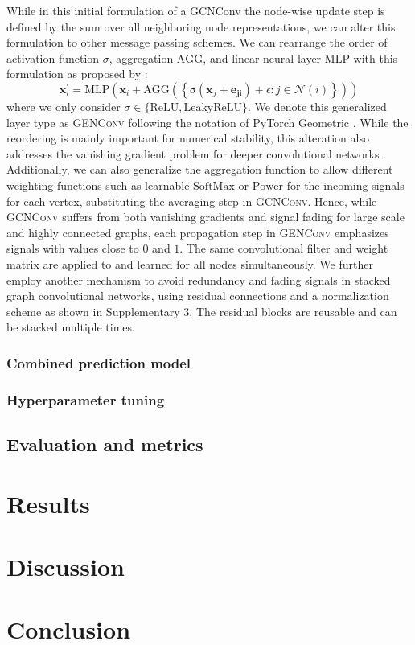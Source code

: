 \documentclass[]{article}
\renewcommand{\cite}{\citep}
\begin{document}
While in this initial formulation of a GCNConv the node-wise update
step is defined by the sum over all neighboring node representations,
we can alter this formulation to other message passing schemes.  We
can rearrange the order of activation function $\sigma$, aggregation
$\mathrm{AGG}$, and linear neural layer $\mathrm{MLP}$ with this
formulation as proposed by \cite{GENConv2020}:
\begin{equation}
	\mathbf{x}_i^{\prime} = \mathrm{MLP} \left( \mathbf{x}_i +
	\mathrm{AGG} \left( \left\{
	\mathrm{\sigma} \left( \mathbf{x}_j + \mathbf{e_{ji}} \right) +\epsilon
	: j \in \mathcal{N}(i) \right\} \right)
	\right)
\end{equation}
where we only consider
$\sigma \in \{\mathrm{ReLU}, \mathrm{LeakyReLU}\}$. We denote this
generalized layer type as \textsc{GENConv} following the notation of
PyTorch Geometric \cite{PytorchGeometric}.  While the reordering is
mainly important for numerical stability, this alteration also addresses
the vanishing gradient problem for deeper convolutional networks
\cite{GENConv2020}. Additionally, we can also generalize the
aggregation function to allow different weighting functions such as
learnable $\mathrm{SoftMax}$ or $\mathrm{Power}$ for the incoming
signals for each vertex, substituting the averaging step in
\textsc{GCNConv}. Hence, while \textsc{GCNConv} suffers from both
vanishing gradients and signal fading for large scale and highly
connected graphs, each propagation step in \textsc{GENConv} emphasizes
signals with values close to $0$ and $1$. The same convolutional
filter and weight matrix are applied to and learned for all nodes
simultaneously. %
We further employ another mechanism to avoid redundancy and fading
signals in stacked graph convolutional networks, using residual
connections and a normalization scheme \cite{DeepGCN2019}
	\cite{GENConv2020} as shown in Supplementary 3.  The residual
blocks are reusable and can be stacked multiple times.

\subsubsection{Combined prediction model}

\subsubsection{Hyperparameter tuning}

\subsection{Evaluation and metrics}

\section{Results}

\section{Discussion}

\section{Conclusion}

\newpage


\end{document}
